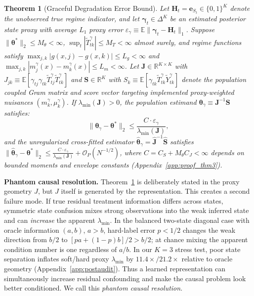 \documentclass[twoside]{article}
\newtheorem{theorem}{Theorem}
\theoremstyle{definition}
\newcommand{\E}{\mathbb{E}}
\newcommand{\R}{\mathbb{R}}
\begin{document}
\begin{theorem}[Graceful Degradation Error Bound]
\label{thm:graceful}
Let $\boldsymbol{H}_t = \boldsymbol{e}_{S_t} \in \{0, 1\}^K$ denote the unobserved true regime indicator, and let $\boldsymbol{\gamma}_t \in \Delta^K$ be an estimated posterior state proxy with average $L_1$ proxy error $\varepsilon_\gamma \equiv \E\|\boldsymbol{\gamma}_t - \boldsymbol{H}_t\|_1$. Suppose $\|\boldsymbol{\theta}^*\|_2 \le M_\theta < \infty$, $\sup_t |\tilde{T}_{tk}^\gamma| \le M_T < \infty$ almost surely, and regime functions satisfy $\max_{j, k}|g(x, j) - g(x, k)| \le L_g < \infty$ and $\max_{j, k}|m_j^\gamma(x) - m_k^\gamma(x)| \le L_m < \infty$.
Let $\boldsymbol{J} \in \R^{K \times K}$ with $J_{jk} \equiv \E[\gamma_{tj}\gamma_{tk} \tilde{T}_{tj}^\gamma \tilde{T}_{tk}^\gamma]$ and $\boldsymbol{S} \in \R^K$ with $S_k \equiv \E[\gamma_{tk} \tilde{T}_{tk}^\gamma \tilde{Y}_{tk}^\gamma]$ denote the population coupled Gram matrix and score vector targeting implemented proxy-weighted nuisances $(m_k^\gamma, \mu_k^\gamma)$. If $\lambda_{\min}(\boldsymbol{J}) > 0$, the population estimand $\boldsymbol{\theta}_\gamma \equiv \boldsymbol{J}^{-1}\boldsymbol{S}$ satisfies:
\begin{equation}
\label{eq:graceful_bound}
    \|\boldsymbol{\theta}_\gamma - \boldsymbol{\theta}^*\|_2 \le \frac{C \cdot \varepsilon_\gamma}{\lambda_{\min}(\boldsymbol{J})},
\end{equation}
and the unregularized cross-fitted estimator $\hat{\boldsymbol{\theta}}_\gamma = \hat{\boldsymbol{J}}^{-1}\hat{\boldsymbol{S}}$ satisfies $\|\hat{\boldsymbol{\theta}}_\gamma - \boldsymbol{\theta}^*\|_2 \le \frac{C \cdot \varepsilon_\gamma}{\lambda_{\min}(\boldsymbol{J})} + \mathcal{O}_P(N^{-1/2})$, where $C = C_S + M_\theta C_J < \infty$ depends on bounded moments and envelope constants (Appendix~\ref{app:proof_thm3}).
\end{theorem}
\textbf{Phantom causal resolution.} Theorem~\ref{thm:graceful} is deliberately stated in the proxy geometry $J$, but $J$ itself is generated by the representation. This creates a second failure mode. If true residual treatment information differs across states, symmetric state confusion mixes strong observations into the weak inferred state and can \emph{increase} the apparent $\lambda_{\min}$. In the balanced two-state diagonal case with oracle information $(a,b)$, $a>b$, hard-label error $p<1/2$ changes the weak direction from $b/2$ to $[pa+(1-p)b]/2>b/2$; at chance mixing the apparent condition number is one regardless of $a/b$. In our $K=3$ stress test, poor state separation inflates soft/hard proxy $\lambda_{\min}$ by $11.4\times/21.2\times$ relative to oracle geometry (Appendix~\ref{app:postaudit}). Thus a learned representation can simultaneously increase residual confounding and make the causal problem look better conditioned. We call this \emph{phantom causal resolution}.
\end{document}
